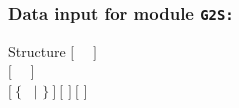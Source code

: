 \clearpage

\subsubsection{Data input for module {\tt G2S:}}\label{sect:descG2S}

\vskip -0.5cm

\begin{DataStructure}{Structure }
$[$~ ~$]$ \\
$[$~ ~$]$ \\
$[~\{$~ $|$  $\}~]~[$    $]~[$    $]$ \\
\moc{;}
\end{DataStructure}

\vskip -0.3cm

